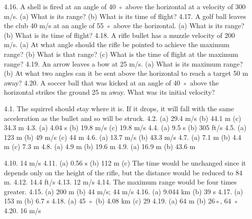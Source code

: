 4.16. A shell is fired at an angle of 40 ◦ above the horizontal at a velocity of 300 m/s. (a) What is its range? (b) What is its
time of flight?
4.17. A golf ball leaves the club 40 m/s at an angle of 55 ◦ above the horizontal. (a) What is its range? (b) What is its time
of flight?
4.18. A rifle bullet has a muzzle velocity of 200 m/s. (a) At what angle should the rifle be pointed to achieve the maximum
range? (b) What is that range? (c) What is the time of flight at the maximum range?
4.19. An arrow leaves a bow at 25 m/s. (a) What is its maximum range? (b) At what two angles can it be sent above the
horizontal to reach a target 50 m away?
4.20. A soccer ball that was kicked at an angle of 40 ◦ above the horizontal strikes the ground 25 m away. What was its
initial velocity?


4.1. The squirrel should stay where it is. If it drops, it will fall with the same acceleration as the bullet and so will be struck.
4.2. (a) 29.4 m/s (b) 44.1 m (c) 34.3 m
4.3. (a) 4.04 s (b) 19.8 m/s (c) 19.8 m/s
4.4. (a) 9.5 s (b) 305 ft/s
4.5. (a) 123 m (b) 49 m/s (c) 44 m
4.6. (a) 13.7 m/s (b) 43.3 m/s
4.7. (a) 7.1 m (b) 4.4 m (c) 7.3 m
4.8. (a) 4.9 m (b) 19.6 m
4.9. (a) 16.9 m (b) 43.6 m


4.10. 14 m/s
4.11. (a) 0.56 s (b) 112 m (c) The time would be unchanged since it depends only on the height of the rifle, but the distance would be reduced to 84 m.
4.12. 14.4 ft/s
4.13. 12 m/s
4.14. The maximum range would be four times greater.
4.15. (a) 200 m (b) 44 m/s; 44 m/s
4.16. (a) 9.044 km (b) 39 s
4.17. (a) 153 m (b) 6.7 s
4.18. (a) 45 ◦ (b) 4.08 km (c) 29
4.19. (a) 64 m (b) 26◦, 64 ◦
4.20. 16 m/s




\endinput

